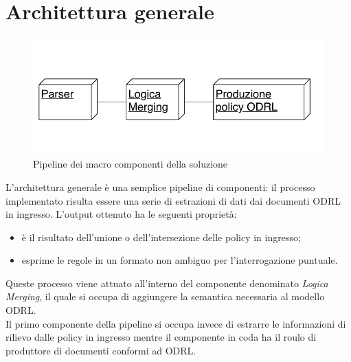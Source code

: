 \documentclass[12pt,a4paper,twoside]{book}
\begin{document}
\section{Architettura generale}
\begin{figure}[htp]
\centering
\includegraphics[scale=1]{../immagini/arch_gen.pdf}
\caption{Pipeline dei macro componenti della soluzione}
\label{archGenImpl}
\end{figure}
L'architettura generale è una semplice pipeline di componenti: il processo implementato risulta essere una serie di estrazioni di dati dai documenti ODRL in ingresso. L'output ottenuto ha le seguenti proprietà:
\begin{itemize}
\item è il risultato dell'unione o dell'intersezione delle policy in ingresso;
\item esprime le regole in un formato non ambiguo per l'interrogazione puntuale.
\end{itemize}
Queste processo viene attuato all'interno del componente denominato \textit{Logica Merging}, il quale si occupa di aggiungere la semantica necessaria al modello ODRL.\\
Il primo componente della pipeline si occupa invece di estrarre le informazioni di rilievo dalle policy in ingresso mentre il componente in coda ha il roulo di produttore di documenti conformi ad ODRL.
\end{document}
